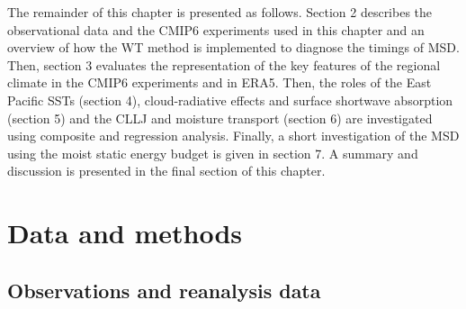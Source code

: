 
 
The remainder of this chapter is presented as follows. Section 2 describes the observational data and the CMIP6 experiments used in this chapter and an overview of how the WT method is implemented to diagnose the timings of MSD. Then, section 3 evaluates the representation of the key features of the regional climate in the CMIP6 experiments and in ERA5.
Then, the roles of the East Pacific SSTs (section 4), cloud-radiative effects and surface shortwave absorption (section 5) and the CLLJ and moisture transport (section 6) are investigated using composite and regression analysis. Finally, a short investigation of the MSD using the moist static energy budget is given in section 7. A summary and discussion is presented in the final section of this chapter. 
  







\section{Data and methods}

\subsection{Observations and reanalysis data}

